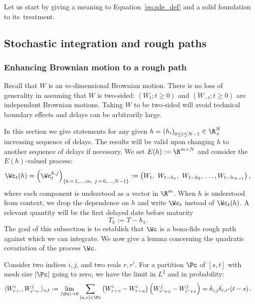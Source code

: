 Let us start by giving a meaning to Equation~\eqref{eq:sde_def} and a solid foundation to its~treatment.

\subsection{Stochastic integration and rough paths}\label{subsection:rough_paths}

\subsubsection{Enhancing Brownian motion to a rough path}
Recall that $W$ is an $m$-dimensional Brownian motion. There is no loss of generality in assuming that $W$ is two-sided: $\left(W_t; t\geq 0 \right)$ and $\left(W_{-t};t \geq 0 \right)$ are independent Brownian motions. Taking $W$ to be two-sided will avoid technical boundary effects and delays can be arbitrarily large.

In this section we give statements for any given $h = \left(h_i \right)_{0 \leq i \leq N-1} \in \R_+^{N}$ increasing sequence of delays. The results will be valid upon changing $h$ to another sequence of delays if necessary. We set $E(h) := \R^{m \times N}$ and consider the $E(h)$-valued process:
\[
\Wc_t(h) = \left(\Wc_t^{k,j}\right)_{\left\{{k\,=\,1,\dots, m,\ j\,=\,0,\dots, N-1}\right\}}
:= \left(W_t, \ W_{t-h_1}, \ W_{t-h_2}, \, \dots, W_{t-h_{N-1}} \right),
\]
where each component is understood as a vector in $\R^m$. When $h$ is understood from context, we drop the dependence on $h$ and write $\Wc_t$ instead of $\Wc_t(h)$. A relevant quantity will be the first delayed date before maturity
\begin{equation}\label{def-th}
T_{h}:= T-{h_1}.
\end{equation}
The goal of this subsection is to establish that $\Wc$ is a bona-fide rough path against which we can integrate. We now give a lemma concerning the quadratic covariation of the process $\Wc$.

\begin{lemm}\label{lemma:zero_cov}
Consider two indices $i,j$, and two reals $r,r'$. For a partition $\Pc$ of $[s,t]$ with mesh size $|\Pc|$ going to zero, we have the limit in $L^2$ and in probability:
\[
\langle W^i_{r+\cdot}, W^j_{r'+\cdot} \rangle_{s,t}
:= \lim_{|\Pc| \rightarrow 0} \sum_{[u,v] \in \Pc} \left(W^i_{r+v} - W^i_{r+u} \right) \left(W^j_{r'+v} - W^j_{r'+v} \right)
= \delta_{i,j} \delta_{r,r'} (t-s)\,.
\]
\end{lemm}



